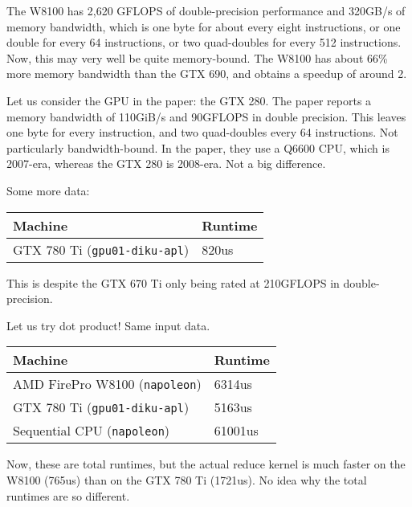 \documentclass[a4paper, oneside, final]{memoir}
\begin{document}
The W8100 has 2,620 GFLOPS of double-precision performance and 320GB/s
of memory bandwidth, which is one byte for about every eight
instructions, or one double for every 64 instructions, or two
quad-doubles for every 512 instructions.  Now, this may very well be
quite memory-bound.  The W8100 has about 66\% more memory bandwidth
than the GTX 690, and obtains a speedup of around 2.

Let us consider the GPU in the paper: the GTX 280.  The paper reports
a memory bandwidth of 110GiB/s and 90GFLOPS in double precision.  This
leaves one byte for every instruction, and two quad-doubles every 64
instructions.  Not particularly bandwidth-bound.  In the paper, they
use a Q6600 CPU, which is 2007-era, whereas the GTX 280 is 2008-era.
Not a big difference.

Some more data:

\begin{tabular}{l|l}
  \hline
  Machine & Runtime \\\hline
  GTX 780 Ti (\texttt{gpu01-diku-apl}) & 820us
\end{tabular}

This is despite the GTX 670 Ti only being rated at 210GFLOPS in
double-precision.

Let us try dot product!  Same input data.

\begin{tabular}{l|l}
  \hline
  Machine & Runtime \\\hline
  AMD FirePro W8100 (\texttt{napoleon}) & 6314us \\
  GTX 780 Ti (\texttt{gpu01-diku-apl}) & 5163us \\
  Sequential CPU (\texttt{napoleon}) & 61001us \\
\end{tabular}

Now, these are total runtimes, but the actual reduce kernel is much
faster on the W8100 (765us) than on the GTX 780 Ti (1721us).  No idea
why the total runtimes are so different.

\begin{quote}
\end{quote}

\begin{quote}
\end{quote}

\begin{quote}
\end{quote}
\end{document}
